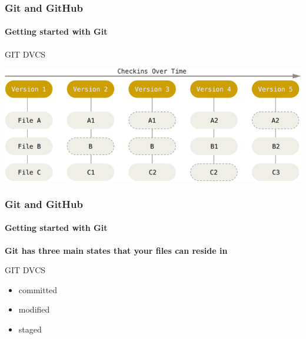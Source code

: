 \begin{frame}
    \frametitle{Git and GitHub}
    \framesubtitle{Getting started with Git}
    \addtocounter{nframe}{1}
    
    \begin{block}{GIT DVCS}
        \begin{center}

            \includegraphics[width=.8\textwidth]{imgs/snapshots-git.png}
    
        \end{center}
    
    \end{block}
    

\end{frame}

\begin{frame}
    \frametitle{Git and GitHub}
    \framesubtitle{Getting started with Git}
    \addtocounter{nframe}{1}
    
    \textbf{Git has three main states that your files can reside in}

    \begin{block}{GIT DVCS}
       \begin{itemize}
           \item committed
           \item modified 
           \item staged
       \end{itemize}
    
    \end{block}

\end{frame}

